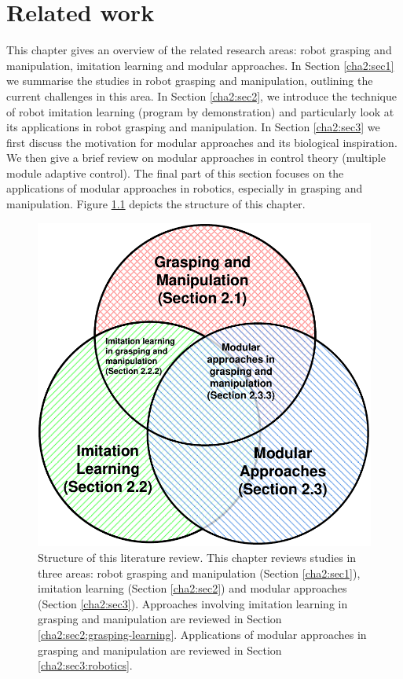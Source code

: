 \chapter{Related work}
\label{cha2}

This chapter gives an overview of the related research areas: robot grasping and manipulation, imitation learning and modular approaches. In Section \ref{cha2:sec1} we summarise the studies in robot grasping and manipulation, outlining the current challenges in this area. In Section \ref{cha2:sec2}, we introduce the technique of robot imitation learning (program by demonstration) and particularly look at its applications in robot grasping and manipulation. In Section \ref{cha2:sec3} we first discuss the motivation for modular approaches and its biological inspiration. We then give a brief review on modular approaches in control theory (multiple module adaptive control). The final part of this section focuses on the applications of modular approaches in robotics, especially in grasping and manipulation. Figure \ref{fig:litreview} depicts the structure of this chapter.

\begin{figure}
\centering
  \includegraphics[width=12cm]{./fig_cha2/litreview.pdf}
  \caption{Structure of this literature review. This chapter reviews studies in three areas: robot grasping and manipulation (Section \ref{cha2:sec1}), imitation learning (Section \ref{cha2:sec2}) and modular approaches (Section \ref{cha2:sec3}). Approaches involving imitation learning in grasping and manipulation are reviewed in Section \ref{cha2:sec2:grasping-learning}. Applications of modular approaches in grasping and manipulation are reviewed in Section \ref{cha2:sec3:robotics}.}
  \label{fig:litreview}
\end{figure}





%
%
%





